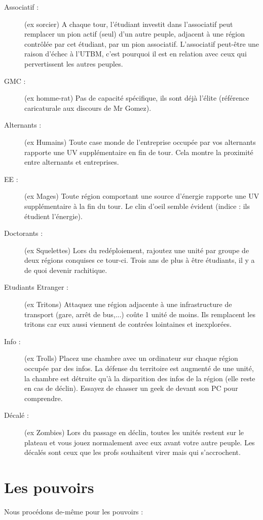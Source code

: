 \documentclass[11pt]{report}
\begin{document}
\begin{description}
		\item[Associatif :] (ex sorcier) A chaque tour, l'étudiant investit dans l'associatif peut remplacer un pion actif (seul) d'un autre peuple, adjacent à une région contrôlée par cet étudiant, par un pion associatif. L'associatif peut-être une raison d'échec à l'UTBM, c'est pourquoi il est en relation avec ceux qui pervertissent les autres peuples.
		\item[GMC :] (ex homme-rat) Pas de capacité spécifique, ils sont déjà l'élite (référence caricaturale aux discours de Mr Gomez).
		\item[Alternants :] (ex Humains) Toute case monde de l'entreprise occupée par vos alternants rapporte une UV supplémentaire en fin de tour. Cela montre la proximité entre alternants et entreprises.
		\item[EE : ] (ex Mages) Toute région comportant une source d'énergie rapporte une UV supplémentaire à la fin du tour. Le clin d'oeil semble évident (indice : ils étudient l'énergie).
		\item[Doctorants :] (ex Squelettes) Lors du redéploiement, rajoutez une unité par groupe de deux régions conquises ce tour-ci. Trois ans de plus à être étudiants, il y a de quoi devenir rachitique.
		\item[Etudiants Etranger :] (ex Tritons) Attaquez une région adjacente à une infrastructure de transport (gare, arrêt de bus,...) coûte 1 unité de moins. Ils remplacent les tritons car eux aussi viennent de contrées lointaines et inexplorées.
		\item[Info :] (ex Trolls) Placez une chambre avec un ordinateur sur chaque région occupée par des infos. La défense du territoire est augmenté de une unité, la chambre est détruite qu'à la disparition des infos de la région (elle reste en cas de déclin). Essayez de chasser un geek de devant son PC pour comprendre.
		\item[Décalé :] (ex Zombies) Lors du passage en déclin, toutes les unités restent sur le plateau et vous jouez normalement avec eux avant votre autre peuple. Les décalés sont ceux que les profs souhaitent virer mais qui s'accrochent.
	\end{description}

	\section{Les pouvoirs}
	Nous procédons de-même pour les pouvoirs :
	
\end{document}
